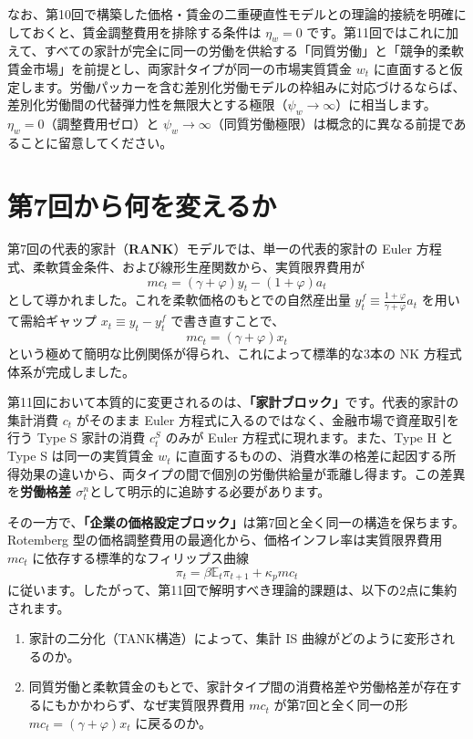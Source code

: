 \documentclass[
  japanese,
  lualatex,
  ja=standard,
  12pt,
  a4paper]{ltjsarticle}
\providecommand{\tightlist}{%
  \setlength{\itemsep}{0pt}\setlength{\parskip}{0pt}}
\begin{document}
なお、第10回で構築した価格・賃金の二重硬直性モデルとの理論的接続を明確にしておくと、賃金調整費用を排除する条件は
\(\eta_w=0\)
です。第11回ではこれに加えて、すべての家計が完全に同一の労働を供給する「同質労働」と「競争的柔軟賃金市場」を前提とし、両家計タイプが同一の市場実質賃金
\(w_t\)
に直面すると仮定します。労働パッカーを含む差別化労働モデルの枠組みに対応づけるならば、差別化労働間の代替弾力性を無限大とする極限（\(\psi_w \to \infty\)）に相当します。\(\eta_w=0\)（調整費用ゼロ）と
\(\psi_w \to \infty\)（同質労働極限）は概念的に異なる前提であることに留意してください。

\section{第7回から何を変えるか}\label{ux7b2c7ux56deux304bux3089ux4f55ux3092ux5909ux3048ux308bux304b}

第7回の代表的家計（\textbf{RANK}）モデルでは、単一の代表的家計の Euler
方程式、柔軟賃金条件、および線形生産関数から、実質限界費用が \[
mc_t = (\gamma+\varphi)y_t - (1+\varphi)a_t
\] として導かれました。これを柔軟価格のもとでの自然産出量
\(y_t^f \equiv \frac{1+\varphi}{\gamma+\varphi}a_t\)
を用いて需給ギャップ \(x_t \equiv y_t - y_t^f\) で書き直すことで、 \[
mc_t = (\gamma+\varphi)x_t
\] という極めて簡明な比例関係が得られ、これによって標準的な3本の NK
方程式体系が完成しました。

第11回において本質的に変更されるのは、\textbf{「家計ブロック」}です。代表的家計の集計消費
\(c_t\) がそのまま Euler
方程式に入るのではなく、金融市場で資産取引を行う Type S 家計の消費
\(c_t^S\) のみが Euler 方程式に現れます。また、Type H と Type S
は同一の実質賃金 \(w_t\)
に直面するものの、消費水準の格差に起因する所得効果の違いから、両タイプの間で個別の労働供給量が乖離し得ます。この差異を\textbf{労働格差
\(\sigma_t^n\)}として明示的に追跡する必要があります。


その一方で、\textbf{「企業の価格設定ブロック」}は第7回と全く同一の構造を保ちます。Rotemberg
型の価格調整費用の最適化から、価格インフレ率は実質限界費用 \(mc_t\)
に依存する標準的なフィリップス曲線 \[
\pi_t
=
\beta \mathbb{E}_t \pi_{t+1}
+
\kappa_p mc_t
\]
に従います。したがって、第11回で解明すべき理論的課題は、以下の2点に集約されます。

\begin{enumerate}
\def\labelenumi{\arabic{enumi}.}
\tightlist
\item
  家計の二分化（TANK構造）によって、集計 IS
  曲線がどのように変形されるのか。
\item
  同質労働と柔軟賃金のもとで、家計タイプ間の消費格差や労働格差が存在するにもかかわらず、なぜ実質限界費用
  \(mc_t\) が第7回と全く同一の形 \(mc_t = (\gamma+\varphi)x_t\)
  に戻るのか。
\end{enumerate}
\end{document}
